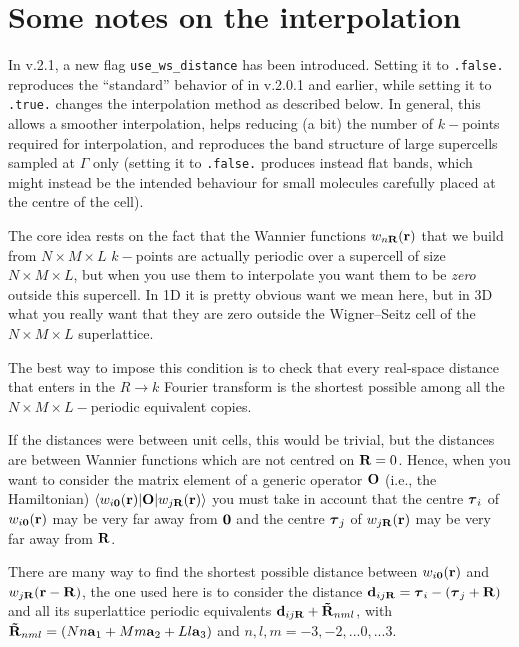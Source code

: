 \chapter{\label{chap:interpolation}Some notes on the interpolation}

In \wannier{} v.2.1, a new flag {\tt use\_ws\_distance} has been 
introduced. Setting it to {\tt .false.} reproduces the 
``standard'' behavior of \wannier{} in v.2.0.1 and earlier,
while setting it to {\tt .true.} changes the interpolation method
as described below. In general, this allows a smoother interpolation,
helps reducing (a bit) the number of $k-$points required for interpolation,
and reproduces the band structure of large supercells sampled at $\Gamma$ 
only (setting it to {\tt .false.} produces instead flat bands, which 
might instead be the intended behaviour for small molecules carefully
placed at the centre of the cell).

The core idea rests on the fact that the Wannier functions $w_{n\bm{\mathrm{R}}}(\bm{\mathrm{r}})$
that we build from $N\times M\times L$ $k-$points are actually periodic 
over a supercell of size $N\times M\times L$, but when you use 
them to interpolate you want them to be \emph{zero} outside this supercell. 
In 1D it is pretty obvious want we mean here, but in 3D what you really 
want that they are zero outside the Wigner--Seitz cell of the 
$N\times M\times L$ superlattice.

The best way to impose this condition is to check that every real-space 
distance that enters in the $R\to k$ Fourier transform is the shortest possible 
among all the $N\times M\times L-$periodic equivalent copies. 

If the distances were between unit cells, this would be trivial, but the 
distances are between Wannier functions which are not centred on $\bm{\mathrm{R}}=0$. 
Hence, when you want to consider the matrix element of a generic operator $\bm{\mathrm{O}}$
(i.e., the Hamiltonian)  $\langle w_{i\bm{\mathrm{0}}}(\bm{\mathrm{r}})|\bm{\mathrm{O}}|w_{j\bm{\mathrm{R}}}(\bm{\mathrm{r}})\rangle$ 
you must take in account that the centre $\bm{\mathrm{\tau}}_i$ of $w_{i\bm{\mathrm{0}}}(\bm{\mathrm{r}})$ may 
be very far away from $\bm{\mathrm{0}}$ and the centre $\bm{\mathrm{\tau}}_j$ of $w_{j\bm{\mathrm{R}}}(\bm{\mathrm{r}})$
may be very far away from $\bm{\mathrm{R}}$.

There are many way to find the shortest possible distance between $w_{i\bm{\mathrm{0}}}(\bm{\mathrm{r}})$ and 
$w_{j\bm{\mathrm{R}}}(\bm{\mathrm{r}}-\bm{\mathrm{R}})$, the one used here is to consider the distance
$\bm{\mathrm{d}}_{ij\bm{\mathrm{R}}} = \bm{\mathrm{\tau}}_i - (\bm{\mathrm{\tau}}_j+\bm{\mathrm{R}})$
and all its superlattice periodic equivalents
$\bm{\mathrm{d}}_{ij\bm{\mathrm{R}}}+ \bm{\mathrm{\tilde R}}_{nml}$, with 
$\bm{\mathrm{\tilde R}}_{nml} = (Nn\bm{\mathrm{a}}_1 + Mm\bm{\mathrm{a}}_2 + Ll\bm{\mathrm{a}}_3)$
and $n,l,m = {-3,-2,...0,...3}$.

